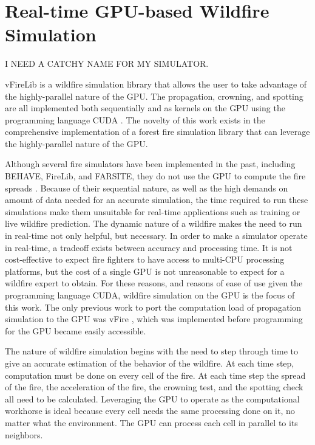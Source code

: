 \chapter{Real-time GPU-based Wildfire Simulation}
\label{chapter:gpuSim}
I NEED A CATCHY NAME FOR MY SIMULATOR. 

vFireLib is a wildfire simulation library that allows the user to take advantage of the highly-parallel nature of the GPU. The propagation, crowning, and spotting are all implemented both sequentially and as kernels on the GPU using the programming language CUDA \cite{cuda}. The novelty of this work exists in the comprehensive implementation of a forest fire simulation library that can leverage the highly-parallel nature of the GPU. 

Although several fire simulators have been implemented in the past, including BEHAVE, FireLib, and FARSITE, they do not use the GPU to compute the fire spreads \cite{fireLib,BEHAVE,FARSITE}. Because of their sequential nature, as well as the high demands on amount of data needed for an accurate simulation, the time required to run these simulations make them unsuitable for real-time applications such as training or live wildfire prediction. The dynamic nature of a wildfire makes the need to run in real-time not only helpful, but necessary. In order to make a simulator operate in real-time, a tradeoff exists between accuracy and processing time. It is not cost-effective to expect fire fighters to have access to multi-CPU processing platforms, but the cost of a single GPU is not unreasonable to expect for a wildfire expert to obtain. For these reasons, and reasons of ease of use given the programming language CUDA, wildfire simulation on the GPU is the focus of this work. The only previous work to port the computation load of propagation simulation to the GPU was vFire \cite{vFire}, which was implemented before programming for the GPU became easily accessible. 

The nature of wildfire simulation begins with the need to step through time to give an accurate estimation of the behavior of the wildfire. At each time step, computation must be done on every cell of the fire. At each time step the spread of the fire, the acceleration of the fire, the crowning test, and the spotting check all need to be calculated. Leveraging the GPU to operate as the computational workhorse is ideal because every cell needs the same processing done on it, no matter what the environment. The GPU can process each cell in parallel to its neighbors. 

